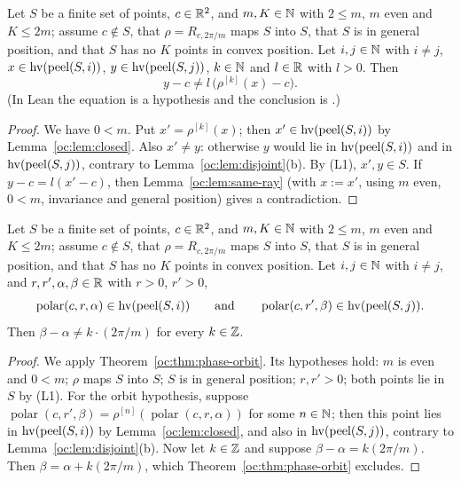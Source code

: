 \begin{theorem}\label{oc:thm:layers-ray}
Let $S$ be a finite set of points, $c\in\mathbb R^2$, and $m,K\in\mathbb N$ with $2\le m$, $m$ even and $K\le2m$; assume
$c\notin S$, that $\rho=R_{c,2\pi/m}$ maps $S$ into $S$, that $S$ is in general position, and that $S$
has no $K$ points in convex position. Let $i,j\in\mathbb N$ with $i\ne j$, $x\in\operatorname{hv}(\operatorname{peel}(S,i))$,
$y\in\operatorname{hv}(\operatorname{peel}(S,j))$, $k\in\mathbb N$ and $l\in\mathbb R$ with $l>0$. Then
\[y-c\ne l\,\bigl(\rho^{[k]}(x)-c\bigr).\]
(In Lean the equation is a hypothesis and the conclusion is .)
\end{theorem}
\begin{proof}
We have $0<m$. Put $x'=\rho^{[k]}(x)$; then $x'\in\operatorname{hv}(\operatorname{peel}(S,i))$ by Lemma~\ref{oc:lem:closed}. Also
$x'\ne y$: otherwise $y$ would lie in $\operatorname{hv}(\operatorname{peel}(S,i))$ and in $\operatorname{hv}(\operatorname{peel}(S,j))$, contrary to
Lemma~\ref{oc:lem:disjoint}(b). By (L1), $x',y\in S$. If $y-c=l(x'-c)$, then
Lemma~\ref{oc:lem:same-ray} (with $x:=x'$, using $m$ even, $0<m$, invariance and general position) gives a
contradiction.
\end{proof}

\begin{theorem}\label{oc:thm:layers-phase}
Let $S$ be a finite set of points, $c\in\mathbb R^2$, and $m,K\in\mathbb N$ with $2\le m$, $m$ even and $K\le2m$; assume
$c\notin S$, that $\rho=R_{c,2\pi/m}$ maps $S$ into $S$, that $S$ is in general position, and that $S$
has no $K$ points in convex position. Let $i,j\in\mathbb N$ with $i\ne j$, and $r,r',\alpha,\beta\in\mathbb R$ with
$r>0$, $r'>0$,
\[\operatorname{polar}(c,r,\alpha)\in\operatorname{hv}(\operatorname{peel}(S,i))\qquad\text{and}\qquad
  \operatorname{polar}(c,r',\beta)\in\operatorname{hv}(\operatorname{peel}(S,j)).\]
Then $\beta-\alpha\ne k\cdot(2\pi/m)$ for every $k\in\mathbb Z$.
\end{theorem}
\begin{proof}
We apply Theorem~\ref{oc:thm:phase-orbit}. Its hypotheses hold: $m$ is even and $0<m$; $\rho$ maps $S$
into $S$; $S$ is in general position; $r,r'>0$; both points lie in $S$ by (L1). For the orbit
hypothesis, suppose $\operatorname{polar}(c,r',\beta)=\rho^{[n]}(\operatorname{polar}(c,r,\alpha))$ for
some $n\in\mathbb N$; then this point lies in $\operatorname{hv}(\operatorname{peel}(S,i))$ by Lemma~\ref{oc:lem:closed}, and also in
$\operatorname{hv}(\operatorname{peel}(S,j))$, contrary to Lemma~\ref{oc:lem:disjoint}(b). Now let $k\in\mathbb Z$ and suppose
$\beta-\alpha=k(2\pi/m)$. Then $\beta=\alpha+k(2\pi/m)$, which Theorem~\ref{oc:thm:phase-orbit} excludes.
\end{proof}

